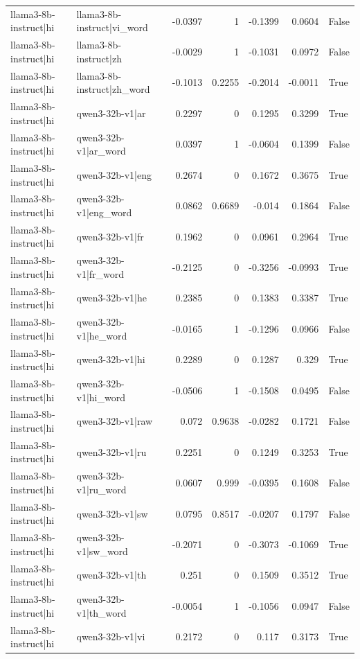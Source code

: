 \begin{table}
\begin{tabular}{l l r r r r l}
llama3-8b-instruct|hi & llama3-8b-instruct|vi_word & -0.0397 & 1 & -0.1399 & 0.0604 & False \\
llama3-8b-instruct|hi & llama3-8b-instruct|zh & -0.0029 & 1 & -0.1031 & 0.0972 & False \\
llama3-8b-instruct|hi & llama3-8b-instruct|zh_word & -0.1013 & 0.2255 & -0.2014 & -0.0011 & True \\
llama3-8b-instruct|hi & qwen3-32b-v1|ar & 0.2297 & 0 & 0.1295 & 0.3299 & True \\
llama3-8b-instruct|hi & qwen3-32b-v1|ar_word & 0.0397 & 1 & -0.0604 & 0.1399 & False \\
llama3-8b-instruct|hi & qwen3-32b-v1|eng & 0.2674 & 0 & 0.1672 & 0.3675 & True \\
llama3-8b-instruct|hi & qwen3-32b-v1|eng_word & 0.0862 & 0.6689 & -0.014 & 0.1864 & False \\
llama3-8b-instruct|hi & qwen3-32b-v1|fr & 0.1962 & 0 & 0.0961 & 0.2964 & True \\
llama3-8b-instruct|hi & qwen3-32b-v1|fr_word & -0.2125 & 0 & -0.3256 & -0.0993 & True \\
llama3-8b-instruct|hi & qwen3-32b-v1|he & 0.2385 & 0 & 0.1383 & 0.3387 & True \\
llama3-8b-instruct|hi & qwen3-32b-v1|he_word & -0.0165 & 1 & -0.1296 & 0.0966 & False \\
llama3-8b-instruct|hi & qwen3-32b-v1|hi & 0.2289 & 0 & 0.1287 & 0.329 & True \\
llama3-8b-instruct|hi & qwen3-32b-v1|hi_word & -0.0506 & 1 & -0.1508 & 0.0495 & False \\
llama3-8b-instruct|hi & qwen3-32b-v1|raw & 0.072 & 0.9638 & -0.0282 & 0.1721 & False \\
llama3-8b-instruct|hi & qwen3-32b-v1|ru & 0.2251 & 0 & 0.1249 & 0.3253 & True \\
llama3-8b-instruct|hi & qwen3-32b-v1|ru_word & 0.0607 & 0.999 & -0.0395 & 0.1608 & False \\
llama3-8b-instruct|hi & qwen3-32b-v1|sw & 0.0795 & 0.8517 & -0.0207 & 0.1797 & False \\
llama3-8b-instruct|hi & qwen3-32b-v1|sw_word & -0.2071 & 0 & -0.3073 & -0.1069 & True \\
llama3-8b-instruct|hi & qwen3-32b-v1|th & 0.251 & 0 & 0.1509 & 0.3512 & True \\
llama3-8b-instruct|hi & qwen3-32b-v1|th_word & -0.0054 & 1 & -0.1056 & 0.0947 & False \\
llama3-8b-instruct|hi & qwen3-32b-v1|vi & 0.2172 & 0 & 0.117 & 0.3173 & True \\

\end{tabular}
\end{table}
